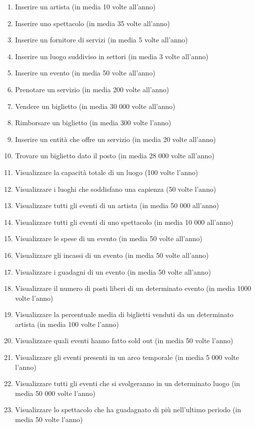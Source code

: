 \documentclass[a4paper,11pt]{article}
\begin{document}
\begin{enumerate}
    \item Inserire un artista (in media 10 volte all'anno)
    \item Inserire uno spettacolo (in media 35 volte all'anno)
    \item Inserire un fornitore di servizi (in media 5 volte all'anno)
    \item Inserire un luogo suddiviso in settori (in media 3 volte all'anno)
    \item Inserire un evento (in media 50 volte all'anno)
    \item Prenotare un servizio (in media 200 volte all'anno)
    \item Vendere un biglietto (in media 30 000 volte all'anno)
    \item Rimborsare un biglietto (in media 300 volte l'anno)
    \item Inserire un entità che offre un servizio (in media 20 volte all'anno)
    \item Trovare un biglietto dato il posto (in media 28 000 volte all'anno)
    \item Visualizzare la capacità totale di un luogo (100 volte l'anno)
    \item Visualizzare i luoghi che soddisfano una capienza (50 volte l'anno)
    \item Visualizzare tutti gli eventi di un artista (in media 50 000 all'anno)
    \item Visualizzare tutti gli eventi di uno spettacolo (in media 10 000 all'anno)
    \item Visualizzare le spese di un evento (in media 50 volte all'anno)
    \item Visualizzare gli incassi di un evento (in media 50 volte all'anno)
    \item Visualizzare i guadagni di un evento (in media 50 volte all'anno)
    \item Visualizzare il numero di posti liberi di un determinato evento (in media 1000 volte l'anno)
    \item Visualizzare la percentuale media di biglietti venduti da un determinato artista (in media 100 volte l'anno)
    \item Visualizzare quali eventi hanno fatto sold out (in media 50 volte l'anno)
    \item Visualizzare gli eventi presenti in un arco temporale (in media 5 000 volte l'anno)
    \item Visualizzare tutti gli eventi che si svolgeranno in un determinato luogo (in media 50 000 volte l'anno)
    \item Visualizzare lo spettacolo che ha guadagnato di più nell'ultimo periodo (in media 50 volte l'anno)
\end{enumerate}
\end{document}
